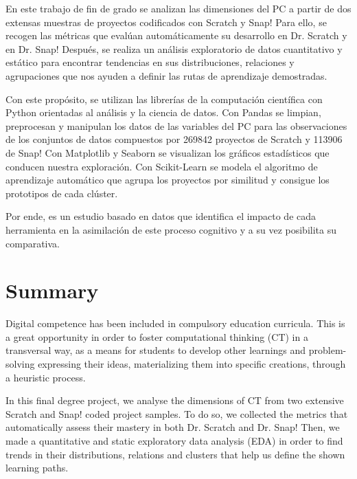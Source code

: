 \documentclass[a4paper, 12pt]{book}
\begin{document}
En este trabajo de fin de grado se analizan las dimensiones del PC a partir de dos extensas muestras de proyectos codificados con Scratch y Snap! Para ello, se recogen las métricas que evalúan automáticamente su desarrollo en Dr. Scratch y en Dr. Snap! Después, se realiza un análisis exploratorio de datos cuantitativo y estático para encontrar tendencias en sus distribuciones, relaciones y agrupaciones que nos ayuden a definir las rutas de aprendizaje demostradas. 

Con este propósito, se utilizan las librerías de la computación científica con Python orientadas al análisis y la ciencia de datos. Con Pandas se limpian, preprocesan y manipulan los datos de las variables del PC para las observaciones de los conjuntos de datos compuestos por 269842 proyectos de Scratch y 113906 de Snap! Con Matplotlib y Seaborn se visualizan los gráficos estadísticos que conducen nuestra exploración. Con Scikit-Learn se modela el algoritmo de aprendizaje automático que agrupa los proyectos por similitud y consigue los prototipos de cada clúster.

Por ende, es un estudio basado en datos que identifica el impacto de cada herramienta en la asimilación de este proceso cognitivo y a su vez posibilita su comparativa.



\chapter*{Summary}


Digital competence has been included in compulsory education curricula. This is a great opportunity in order to foster computational thinking (CT) in a transversal way, as a means for students to develop other learnings and problem-solving expressing their ideas, materializing them into specific creations, through a heuristic process.

In this final degree project, we analyse the dimensions of CT from two extensive Scratch and Snap! coded project samples. To do so, we collected the metrics that automatically assess their mastery in both Dr. Scratch and Dr. Snap! Then, we made a quantitative and static exploratory data analysis (EDA) in order to find trends in their distributions, relations and clusters that help us define the shown learning paths.
\end{document}
